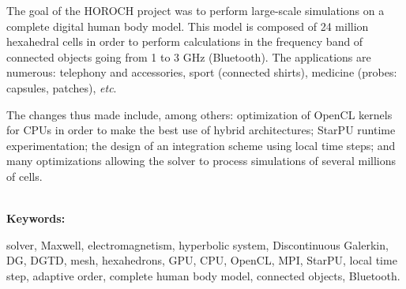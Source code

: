 \documentclass[a4paper,12pt]{report}
\begin{document}
\begin{titlepage}
{{The goal of the HOROCH project was to perform large-scale simulations
on a complete digital human body model.
This model is composed of 24 million hexahedral cells in order
to perform calculations in the frequency band of connected objects
going from 1 to 3 GHz (Bluetooth).
The applications are numerous: telephony and accessories, sport
(connected shirts), medicine (probes: capsules, patches), \textit{etc}.

The changes thus made include, among others: optimization of OpenCL kernels
for CPUs in order to make the best use of hybrid architectures;
StarPU runtime experimentation; the design of an integration scheme using
local time steps; and many optimizations allowing the solver to process
simulations of several millions of cells.

~\\
\textbf{Keywords:}\\
\raggedright
solver, Maxwell, electromagnetism, hyperbolic system,
Discontinuous Galerkin, DG, DGTD, mesh, hexahedrons,
GPU, CPU, OpenCL, MPI, StarPU,
local time step, adaptive order, complete human body model,
connected objects, Bluetooth.
		}
	}
\end{titlepage}
\end{document}
